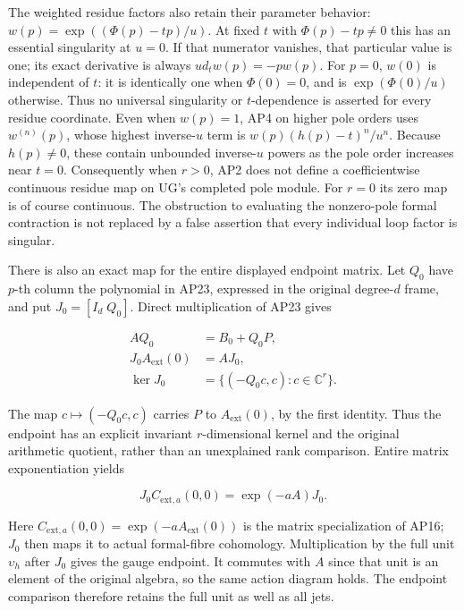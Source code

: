 The weighted residue factors also retain their parameter behavior: \(w(p)=\exp((\Phi(p)-tp)/u)\). At fixed \(t\) with \(\Phi(p)-tp\ne0\) this has an essential singularity at \(u=0\). If that numerator vanishes, that particular value is one; its exact derivative is always \(u d_t w(p)=-p w(p)\). For \(p=0\), \(w(0)\) is independent of \(t\): it is identically one when \(\Phi(0)=0\), and is \(\exp(\Phi(0)/u)\) otherwise. Thus no universal singularity or \(t\)-dependence is asserted for every residue coordinate. Even when \(w(p)=1\), AP4 on higher pole orders uses \(w^{(n)}(p)\), whose highest inverse-\(u\) term is \(w(p)(h(p)-t)^n/u^n\). Because \(h(p)\ne0\), these contain unbounded inverse-\(u\) powers as the pole order increases near \(t=0\). Consequently when \(r>0\), AP2 does not define a coefficientwise continuous residue map on UG's completed pole module. For \(r=0\) its zero map is of course continuous. The obstruction to evaluating the nonzero-pole formal contraction is not replaced by a false assertion that every individual loop factor is singular.

There is also an exact map for the entire displayed endpoint matrix. Let \(Q_0\) have \(p\)-th column the polynomial in AP23, expressed in the original degree-\(d\) frame, and put \(J_0=[I_d\;Q_0]\). Direct multiplication of AP23 gives

\[
\begin{aligned}
A Q_0&=B_0+Q_0 P,\\
J_0 A_{\mathrm{ext}}(0)&=A J_0,\\
\ker J_0&=\{(-Q_0 c,c):c\in\mathbb C^r\}.
\end{aligned}
\tag{AP25}
\]

The map \(c\mapsto(-Q_0 c,c)\) carries \(P\) to \(A_{\mathrm{ext}}(0)\), by the first identity. Thus the endpoint has an explicit invariant \(r\)-dimensional kernel and the original arithmetic quotient, rather than an unexplained rank comparison. Entire matrix exponentiation yields

\[
J_0 C_{\mathrm{ext},a}(0,0)=\exp(-aA)J_0.
\tag{AP26}
\]

Here \(C_{\mathrm{ext},a}(0,0)=\exp(-a A_{\mathrm{ext}}(0))\) is the matrix specialization of AP16; \(J_0\) then maps it to actual formal-fibre cohomology. Multiplication by the full unit \(\upsilon_h\) after \(J_0\) gives the gauge endpoint. It commutes with \(A\) since that unit is an element of the original algebra, so the same action diagram holds. The endpoint comparison therefore retains the full unit as well as all jets.

